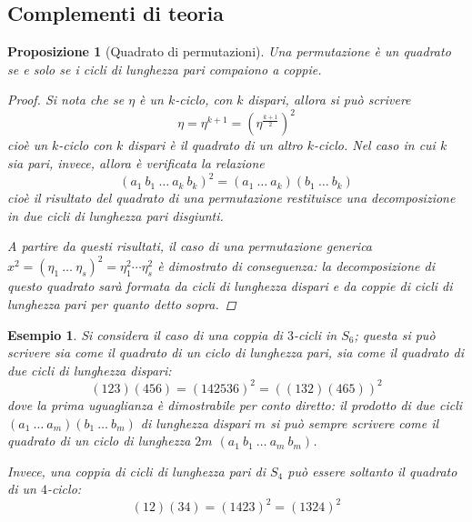 \documentclass[12pt]{scrartcl}
\theoremstyle{style}
\newtheorem{esempio}{Esempio}[section]
\newtheorem{prop}{Proposizione}[section]
\numberwithin{equation}{subsection}
\begin{document}
\newpage
\subsection{Complementi di teoria}
\begin{prop}[Quadrato di permutazioni]\label{qperm}
	Una permutazione \`e un quadrato se e solo se i cicli di lunghezza pari compaiono a coppie.
	\begin{proof}
		Si nota che se $\eta$ \`e un $k$-ciclo, con $k$ dispari, allora si pu\`o scrivere
		\[
		\eta = \eta^{k+1} = \left(\eta^{\frac{k+1}{2}}\right) ^2
		\] 
		cio\`e un $k$-ciclo con $k$ dispari \`e il quadrato di un altro $k$-ciclo.
		Nel caso in cui $k$ sia pari, invece, allora \`e verificata la relazione
		\[
			(a_1 \ b_1 \ \ldots \ a_k\ b_k)^2 = (a_1\ \ldots\ a_k) (b_1\ \ldots \ b_k)
		\] 
	cio\`e il risultato del quadrato di una permutazione restituisce una decomposizione in due cicli di lunghezza pari disgiunti.	

	A partire da questi risultati, il caso di una permutazione generica $x^2= (\eta_1 \ \ldots\ \eta_s)^2=\eta_1^2 \cdots \eta_s^2$ \`e dimostrato di conseguenza: la decomposizione di questo quadrato sar\`a formata da cicli di lunghezza dispari e da coppie di cicli di lunghezza pari per quanto detto sopra.
\end{proof}
\end{prop}
\begin{esempio}
Si considera il caso di una coppia di $3$-cicli in $S_6$; questa si pu\`o scrivere sia come il quadrato di un ciclo di lunghezza pari, sia come il quadrato di due cicli di lunghezza dispari:
\[
	(123)(456) = (142536)^2 = ((132)(465))^2
\] 
dove la prima uguaglianza \`e dimostrabile per conto diretto: il prodotto di due cicli $(a_1\ \ldots\ a_m)(b_1\ \ldots\ b_m)$ di lunghezza dispari $m$ si pu\`o sempre scrivere come il quadrato di un ciclo di lunghezza $2m$ $(a_1\ b_1\ \ldots\ a_m\ b_m)$.

Invece, una coppia di cicli di lunghezza pari di $S_4$ pu\`o essere soltanto il quadrato di un $4$-ciclo:
\[
	(12)(34) = (1423)^2 = (1324)^2
\] 

\end{esempio}
\end{document}
